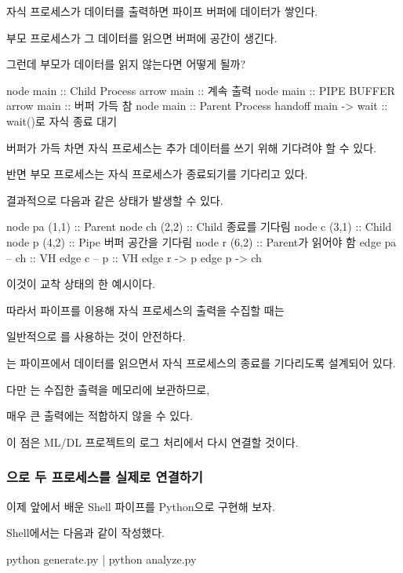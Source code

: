 자식 프로세스가 데이터를 출력하면 파이프 버퍼에 데이터가 쌓인다.

부모 프로세스가 그 데이터를 읽으면 버퍼에 공간이 생긴다.

그런데 부모가 데이터를 읽지 않는다면 어떻게 될까?

\begin{dhkbranch}[in=4]
node main :: Child Process
arrow main :: 계속 출력
node main :: PIPE BUFFER
arrow main :: 버퍼 가득 참
node main :: Parent Process
handoff main -> wait :: wait()로 자식 종료 대기
\end{dhkbranch}

버퍼가 가득 차면 자식 프로세스는 추가 데이터를 쓰기 위해 기다려야 할 수 있다.

반면 부모 프로세스는 자식 프로세스가 종료되기를 기다리고 있다.

결과적으로 다음과 같은 상태가 발생할 수 있다.

\begin{dhkdiagram}[in=4]
node pa (1,1) :: Parent
node ch (2,2) :: Child 종료를 기다림
node c (3,1) :: Child
node p (4,2) :: Pipe 버퍼 공간을 기다림
node r (6,2) :: Parent가 읽어야 함
edge pa -- ch :: VH
edge c -- p :: VH
edge r -> p
edge p -> ch
\end{dhkdiagram}

이것이 교착 상태의 한 예시이다.

따라서 파이프를 이용해 자식 프로세스의 출력을 수집할 때는

일반적으로 를 사용하는 것이 안전하다.

는 파이프에서 데이터를 읽으면서 자식 프로세스의 종료를 기다리도록 설계되어 있다.

다만 는 수집한 출력을 메모리에 보관하므로,

매우 큰 출력에는 적합하지 않을 수 있다.

이 점은 ML/DL 프로젝트의 로그 처리에서 다시 연결할 것이다.

\subsubsection{으로 두 프로세스를 실제로 연결하기}

이제 앞에서 배운 Shell 파이프를 Python으로 구현해 보자.

Shell에서는 다음과 같이 작성했다.

\begin{dhkzsh}
python generate.py | python analyze.py
\end{dhkzsh}

